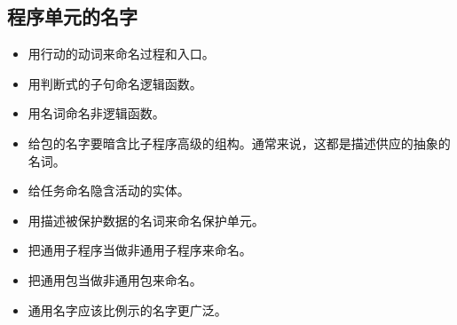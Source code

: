 \subsection{程序单元的名字}
\begin{itemize}
    \item 用行动的动词来命名过程和入口。
    \item 用判断式的子句命名逻辑函数。
    \item 用名词命名非逻辑函数。
    \item 给包的名字要暗含比子程序高级的组构。通常来说，这都是描述供应的抽象的
名词。
    \item 给任务命名隐含活动的实体。
    \item 用描述被保护数据的名词来命名保护单元。
    \item 把通用子程序当做非通用子程序来命名。
    \item 把通用包当做非通用包来命名。
    \item 通用名字应该比例示的名字更广泛。
\end{itemize}

